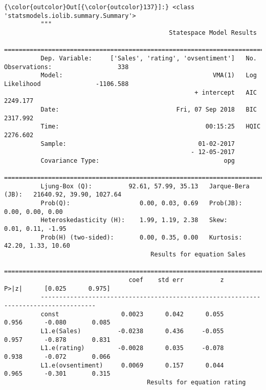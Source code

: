 \documentclass[11pt]{article}
\begin{document}
\begin{Verbatim}[commandchars=\\\{\}]
{\color{outcolor}Out[{\color{outcolor}137}]:} <class 'statsmodels.iolib.summary.Summary'>
          """
                                             Statespace Model Results                                   
          ==============================================================================================
          Dep. Variable:     ['Sales', 'rating', 'ovsentiment']   No. Observations:                  338
          Model:                                         VMA(1)   Log Likelihood               -1106.588
                                                    + intercept   AIC                           2249.177
          Date:                                Fri, 07 Sep 2018   BIC                           2317.992
          Time:                                        00:15:25   HQIC                          2276.602
          Sample:                                    01-02-2017                                         
                                                   - 12-05-2017                                         
          Covariance Type:                                  opg                                         
          ==========================================================================================
          Ljung-Box (Q):          92.61, 57.99, 35.13   Jarque-Bera (JB):   21640.92, 39.90, 1027.64
          Prob(Q):                   0.00, 0.03, 0.69   Prob(JB):                   0.00, 0.00, 0.00
          Heteroskedasticity (H):    1.99, 1.19, 2.38   Skew:                      0.01, 0.11, -1.95
          Prob(H) (two-sided):       0.00, 0.35, 0.00   Kurtosis:                 42.20, 1.33, 10.60
                                        Results for equation Sales                             
          =====================================================================================
                                  coef    std err          z      P>|z|      [0.025      0.975]
          -------------------------------------------------------------------------------------
          const                 0.0023      0.042      0.055      0.956      -0.080       0.085
          L1.e(Sales)          -0.0238      0.436     -0.055      0.957      -0.878       0.831
          L1.e(rating)         -0.0028      0.035     -0.078      0.938      -0.072       0.066
          L1.e(ovsentiment)     0.0069      0.157      0.044      0.965      -0.301       0.315
                                       Results for equation rating                             

\end{Verbatim}
\end{document}
